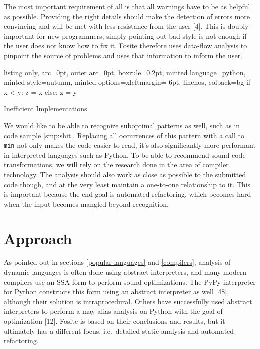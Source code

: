 \documentclass[a4paper, 16pt, oneside]{Thesis}
\begin{document}
The most important requirement of all is that all warnings have to be as
helpful as possible. Providing the right details should make the
detection of errors more convincing and will be met with less resistance
from the user {[}4{]}. This is doubly important for new programmers;
simply pointing out bad style is not enough if the user does not know
how to fix it. Fosite therefore uses data-flow analysis to pinpoint the
source of problems and uses that information to inform the user.

\begin{code}
  \begin{tcblisting}{listing only, 
  arc=0pt,
  outer arc=0pt, 
  boxrule=0.2pt,
  minted language=python,
  minted style=autumn,
  minted options={xleftmargin=-6pt, linenos},
  colback=bg }
if x < y:
  z = x
else:
  z = y
\end{tcblisting}
\caption{Inefficient Implementations} \label{smp:shit}
\end{code}

We would like to be able to recognize suboptimal patterns as well, such
as in code sample \ref{smp:shit}. Replacing all occurrences of this
pattern with a call to \texttt{min} not only makes the code easier to
read, it's also significantly more performant in interpreted languages
such as Python. To be able to recommend sound code transformations, we
will rely on the research done in the area of compiler technology. The
analysis should also work as close as possible to the submitted code
though, and at the very least maintain a one-to-one relationship to it.
This is important because the end goal is automated refactoring, which
becomes hard when the input becomes mangled beyond recognition.

\section{Approach}\label{approach}

As pointed out in sections \ref{popular-languages} and \ref{compilers},
analysis of dynamic languages is often done using abstract interpreters,
and many modern compilers use an SSA form to perform sound
optimizations. The PyPy interpreter for Python constructs this form
using an abstract interpreter as well {[}48{]}, although their solution
is intraprocedural. Others have successfully used abstract interpreters
to perform a may-alias analysis on Python with the goal of optimization
{[}12{]}. Fosite is based on their conclusions and results, but it
ultimately has a different focus, i.e.~detailed static analysis and
automated refactoring.
\end{document}
